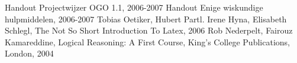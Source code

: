 
\begin{thebibliography}{99}

\bibitem{} Handout Projectwijzer OGO 1.1, 2006-2007
 Handout Enige wiskundige hulpmiddelen, 2006-2007
\bibitem{} Tobias Oetiker, Hubert Partl. Irene Hyna, Elisabeth Schlegl,
    The Not So Short Introduction To Latex, 2006
\bibitem{} Rob Nederpelt, Fairouz Kamareddine, Logical Reasoning: A First
    Course, King's College Publications, London, 2004

\end{thebibliography}
